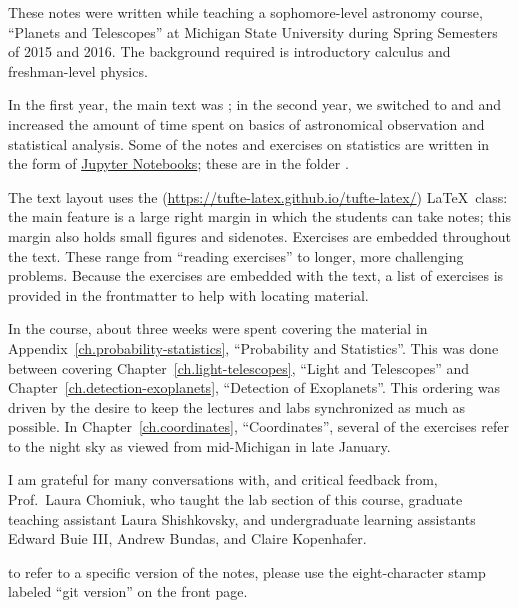 
These notes were written while teaching a sophomore-level astronomy course, ``Planets and Telescopes'' at Michigan State University during Spring Semesters of 2015 and 2016. The background required is  introductory calculus and freshman-level physics.

In the first year, the main text was ; in the second year, we switched to  and  and increased the amount of time spent on basics of astronomical observation and statistical analysis. Some of the notes and exercises on statistics are written in the form of \href{http://jupyter.org}{Jupyter Notebooks}; these are in the folder .

The text layout uses the  (\url{https://tufte-latex.github.io/tufte-latex/}) \LaTeX\ class:  the main feature is a large right margin in which the students can take notes; this margin also holds small figures and sidenotes. Exercises are embedded throughout the text.  These range from ``reading exercises'' to longer, more challenging problems.  Because the exercises are embedded with the text, a list of exercises is provided in the frontmatter to help with locating material.

In the course, about three weeks were spent covering the material in Appendix~\ref{ch.probability-statistics}, ``Probability and Statistics''.  This was done between covering Chapter~\ref{ch.light-telescopes}, ``Light and Telescopes'' and Chapter~\ref{ch.detection-exoplanets}, ``Detection of Exoplanets''.  This ordering was driven by the desire to keep the lectures and labs synchronized as much as possible. In Chapter~\ref{ch.coordinates}, ``Coordinates'', several of the exercises refer to the night sky as viewed from mid-Michigan in late January.

I am grateful for many conversations with, and critical feedback from,  Prof.~Laura Chomiuk, who taught the lab section of this course, graduate teaching assistant Laura Shishkovsky, and undergraduate learning assistants Edward Buie III, Andrew Bundas, and Claire Kopenhafer. 

 to refer to a specific version of the notes, please use the eight-character stamp labeled ``git version'' on the front page.
